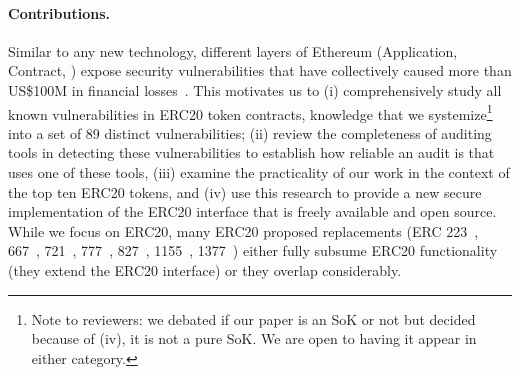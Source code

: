 \paragraph{Contributions.} Similar to any new technology, different layers of Ethereum (\eg Application, Contract, \etc) expose security vulnerabilities that have collectively caused more than US\$100M in financial losses~\cite{DAO1,PeckShield,PartiyMultiSig,MyEthWallet,ParityFirstHack,ParitySecondHack}. This motivates us to (i) comprehensively study all known vulnerabilities in ERC20 token contracts, knowledge that we systemize\footnote{Note to reviewers: we debated if our paper is an SoK or not but decided because of (iv), it is not a pure SoK. We are open to having it appear in either category.} into a set of 89 distinct vulnerabilities; (ii) review the completeness of auditing tools in detecting these vulnerabilities to establish how reliable an audit is that uses one of these tools, (iii) examine the practicality of our work in the context of the top ten ERC20 tokens, and (iv) use this research to provide a new secure implementation of the ERC20 interface that is freely available and open source. While we focus on ERC20, many ERC20 proposed replacements (\ie ERC 223~\cite{Ref20}, 667~\cite{Ref21}, 721~\cite{Ref22}, 777~\cite{Ref23}, 827~\cite{Ref24}, 1155~\cite{Ref25}, 1377~\cite{Ref26}) either fully subsume ERC20 functionality (\ie they extend the ERC20 interface) or they overlap considerably. 